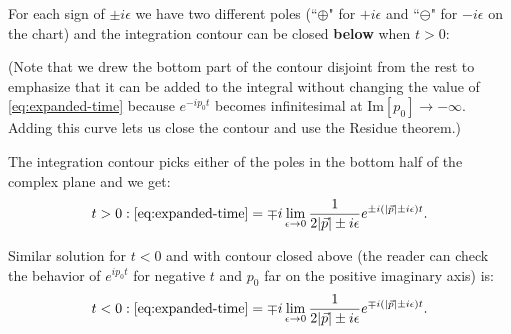 \documentclass[aps,prd,final,twocolumn,floats,floatfix,nofootinbib,10pt]{revtex4-1}
\begin{document}
For each sign of $\pm i \epsilon$ we have two different poles (``$\oplus$" for $+i \epsilon$ and
``$\ominus$" for $-i \epsilon$ on the chart) and the integration contour can be closed
\textbf{below} when $t > 0$:
\begin{center}
\end{center}
(Note that we drew the bottom part of the contour disjoint from the rest to emphasize that it can be added
to the integral without changing the value of \eqref{eq:expanded-time} because $e^{-i p_0 t}$ becomes
infinitesimal at $\text{Im}[p_0] \to -\infty$. Adding this curve lets us close the contour and use the Residue
theorem.)

The integration contour picks either of the poles in the bottom half of the complex plane and we get:
\begin{equation}\label{eq:time-solution-ret}
t > 0 : \eqref{eq:expanded-time} = \mp i \lim_{\epsilon \to 0} \frac{1}{2 |\vec{p}| \pm i \epsilon}
  e^{\pm i \left(|\vec{p}| \pm i \epsilon\right) t}.
\end{equation}

Similar solution for $t < 0$ and with contour closed above (the reader can check the behavior of
$e^{i p_0 t}$ for negative $t$ and $p_0$ far on the positive imaginary axis) is:
\begin{equation}\label{eq:time-solution-adv}
t < 0 : \eqref{eq:expanded-time} = \mp i \lim_{\epsilon \to 0} \frac{1}{2 |\vec{p}| \pm i \epsilon}
  e^{\mp i \left(|\vec{p}| \pm i \epsilon\right) t}.
\end{equation}
\end{document}
